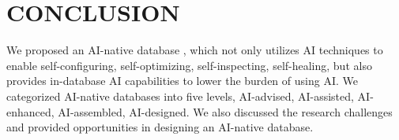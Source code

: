 
\section{CONCLUSION}
\label{sec: conculstion}

We proposed an AI-native database \oursys, which not only utilizes AI techniques to enable self-configuring, self-optimizing, self-inspecting, self-healing, but also provides in-database AI capabilities to lower the burden of using AI. We categorized AI-native databases into five levels, AI-advised, AI-assisted, AI-enhanced, AI-assembled, AI-designed. We also discussed the research challenges and provided opportunities in designing an AI-native database.  





